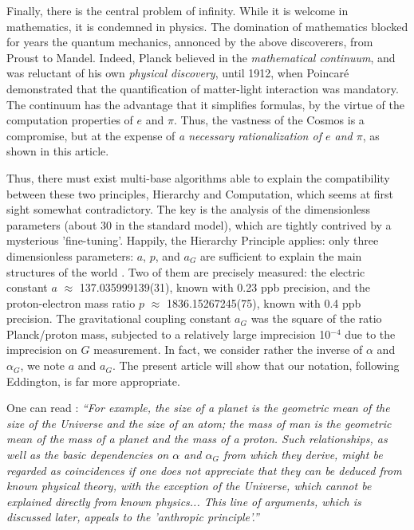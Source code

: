 \documentclass[twoside,draft]{article}
\begin{document}
\begin{sloppypar}
Finally, there is the central problem of infinity. While it is welcome in mathematics, it is condemned in physics. The domination of mathematics blocked for years the quantum mechanics, annonced by the above discoverers, from Proust to Mandel. Indeed, Planck believed in the \textit{mathematical continuum}, and was reluctant of his own \textit{physical discovery}, until 1912, when Poincar\'{e} demonstrated that the quantification of matter-light interaction was mandatory\cite{Sanchez1}. The continuum has the advantage that it simplifies formulas, by the virtue of the computation properties of $e$ and $\pi$. Thus, the vastness of the Cosmos is a compromise, but at the expense of \textit{a necessary rationalization of $e$ and $\pi$}, as shown in this article.

Thus, there must exist multi-base algorithms able to explain the compatibility between these two principles, Hierarchy and Computation, which seems at first sight somewhat contradictory. The key is the analysis of the dimensionless parameters (about 30 in the standard model), which are tightly contrived by a mysterious 'fine-tuning'. Happily, the Hierarchy Principle applies:  only three dimensionless parameters: $a$, $p$, and $a_{G}$ are sufficient to explain the main structures of the world \cite{Carr}. Two of them are precisely measured: the electric constant $a$ $\approx$ 137.035999139(31), known with 0.23 ppb precision, and the proton-electron mass ratio $p$ $\approx$ 1836.15267245(75), known with 0.4 ppb precision. The gravitational coupling constant $a_{G}$ was the square of the ratio Planck/proton mass, subjected to a relatively large imprecision 10$^{-4}\!$ due to the imprecision on $G$ measurement. In fact, we consider rather the inverse of $\alpha$ and $\alpha_G$, we note $a$ and $a_G$. The present article will show that our notation, following Eddington\cite{Eddington}, is far more appropriate.

One can read \cite{Carr}: \textit{“For example, the size of a planet is the geometric mean of the size of the Universe and the size of an atom; the mass of man is the geometric mean of the mass of a planet and the mass of a proton. Such relationships, as well as the basic dependencies on $\alpha$ and $\alpha_G$ from which they derive, might be regarded as coincidences if one does not appreciate that they can be deduced from known physical theory, with the exception of the Universe, which cannot be explained directly from known physics... This line of arguments, which is discussed later, appeals to the 'anthropic principle'.”}


\end{sloppypar}
\end{document}
